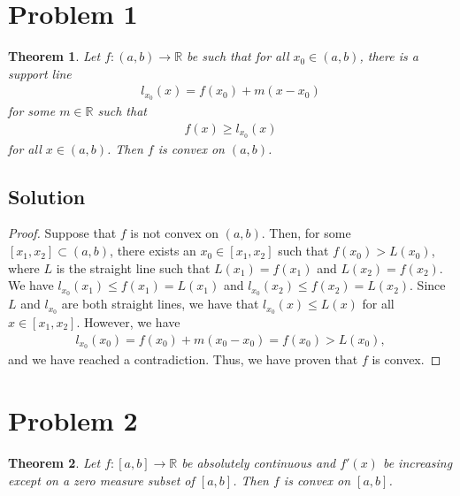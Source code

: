 \documentclass[10pt,a4paper]{article}
\author{Jeremiah Givens}
\theoremstyle{theorem}
\newtheorem{theorem}{Theorem}
\theoremstyle{definition}
\begin{document}
\section*{Problem 1}
\begin{theorem}
Let $f:(a,b) \to \mathbb{R}$ be such that for all $x_0 \in (a, b)$, there is a support line
\begin{align*}
l_{x_0}(x) = f(x_0) + m(x - x_0)
\end{align*}
for some $m \in \mathbb{R}$ such that 
\begin{align*}
f(x) \geq l_{x_0}(x)
\end{align*}
for all $x \in (a, b)$. Then $f$ is convex on $(a, b)$.
\end{theorem}

\subsection*{Solution}
\begin{proof}
Suppose that $f$ is not convex on $(a, b)$. Then, for some $[x_1, x_2] \subset (a, b)$, there exists an $x_0 \in [x_1, x_2]$ such that $f(x_0) > L(x_0)$, where $L$ is the straight line such that $L(x_1) = f(x_1)$ and $L(x_2) = f(x_2)$. We have $l_{x_0}(x_1) \leq f(x_1) = L(x_1)$ and $l_{x_0}(x_2) \leq f(x_2) = L(x_2)$. Since $L$ and $l_{x_0}$ are both straight lines, we have that $l_{x_0}(x) \leq L(x)$ for all $x \in [x_1, x_2]$. However, we have
\begin{align*}
l_{x_0}(x_0) = f(x_0) + m(x_0 - x_0) = f(x_0) > L(x_0),
\end{align*}
and we have reached a contradiction. Thus, we have proven that $f$ is convex.
\end{proof}

\section*{Problem 2}
\begin{theorem}
Let $f:[a, b] \to \mathbb{R}$ be absolutely continuous and $f'(x)$ be increasing except on a zero measure subset of $[a, b]$. Then $f$ is convex on $[a, b]$.
\end{theorem}
\end{document}
